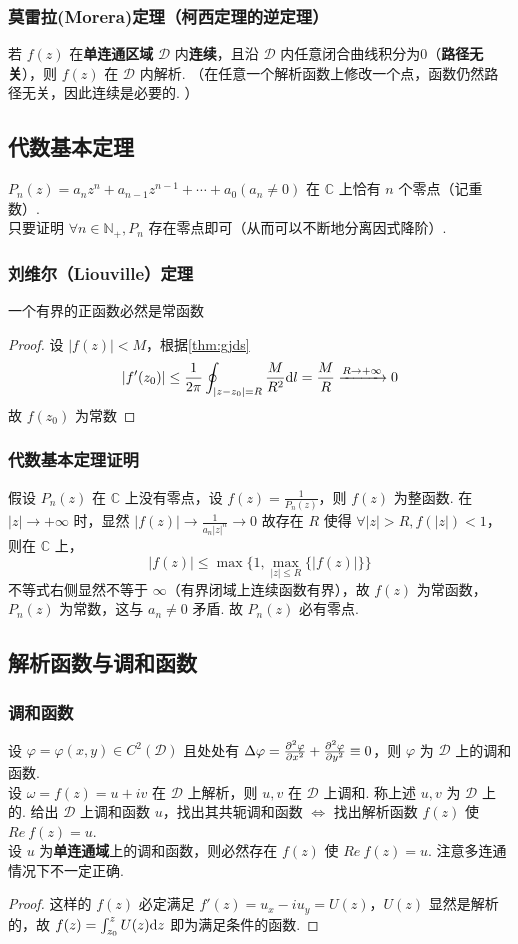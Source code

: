 \documentclass[./main.tex]{subfiles}
\begin{document}
\subsubsection{莫雷拉(Morera)定理（柯西定理的逆定理）}
若 $f(z)$ 在\textbf{单连通区域} $\mathscr{D}$ 内\textbf{连续}，且沿 $\mathscr{D}$ 内任意闭合曲线积分为0（\textbf{路径无关}），则 $f(z)$ 在 $\mathscr{D}$ 内解析. （在任意一个解析函数上修改一个点，函数仍然路径无关，因此连续是必要的. ）
\subsection{代数基本定理}
$P_n(z)=a_nz^n+a_{n-1}z^{n-1}+\cdots+a_0(a_n\neq 0)$ 在 $\mathbb{C}$ 上恰有 $n$ 个零点（记重数）. \\
\indent 只要证明 $\forall n\in \mathbb{N}_{+},P_n$ 存在零点即可（从而可以不断地分离因式降阶）. 
\subsubsection{刘维尔（Liouville）定理}
一个有界的正函数必然是常函数
\begin{proof}
设 $|f(z)|<M$，根据\eqref{thm:gjds}
$$ |f'(z_0)|\le\frac{1}{2\pi}\oint_{|z-z_0|=R}\frac{M}{R^2}\text{d}l=\frac{M}{R}\xrightarrow[]{R\rightarrow+\infty}0 $$
故 $f(z_0)$ 为常数
\end{proof}
\subsubsection{代数基本定理证明}
假设 $P_n(z)$ 在 $\mathbb{C}$ 上没有零点，设 $f(z)=\frac{1}{P_n(z)}$，则 $f(z)$ 为整函数. 在 $|z|\rightarrow+\infty$ 时，显然 $|f(z)|\rightarrow\frac{1}{a_n|z|^n}\rightarrow 0$ 故存在 $R$ 使得 $\forall |z|>R,f(|z|)<1$，则在 $\mathbb{C}$ 上，$$|f(z)|\le\max\{1,\max\limits_{|z|\le R}\{|f(z)|\}\}$$ 不等式右侧显然不等于 $\infty$（有界闭域上连续函数有界），故 $f(z)$ 为常函数，$P_n(z)$ 为常数，这与 $a_n\neq 0$ 矛盾. 故 $P_n(z)$ 必有零点. 
\subsection{解析函数与调和函数}
\subsubsection{调和函数}
设 $\varphi=\varphi(x,y)\in C^2(\mathscr{D})$ 且处处有 $\Delta\varphi=\frac{\partial^2\varphi}{\partial x^2}+\frac{\partial^2\varphi}{\partial y^2}\equiv0$，则 $\varphi$ 为 $\mathscr{D}$ 上的调和函数. \\
\indent 设 $\omega=f(z)=u+iv$ 在 $\mathscr{D}$ 上解析，则 $u,v$ 在 $\mathscr{D}$ 上调和. 称上述 $u,v$ 为 $\mathscr{D}$ 上的. 给出 $\mathscr{D}$ 上调和函数 $u$，找出其共轭调和函数 $\iff$  找出解析函数 $f(z)$ 使 $Re\ f(z)=u$. \\
\indent 设 $u$ 为\textbf{单连通域}上的调和函数，则必然存在 $f(z)$ 使 $Re\ f(z)=u$. 注意多连通情况下不一定正确. 
\begin{proof}
    这样的 $f(z)$ 必定满足  $f'(z)=u_x-iu_y=U(z)$，$U(z)$ 显然是解析的，故 $f(z)=\int_{z_0}^z U(z)\text{d}z$ 即为满足条件的函数. 
\end{proof}
\end{document}
